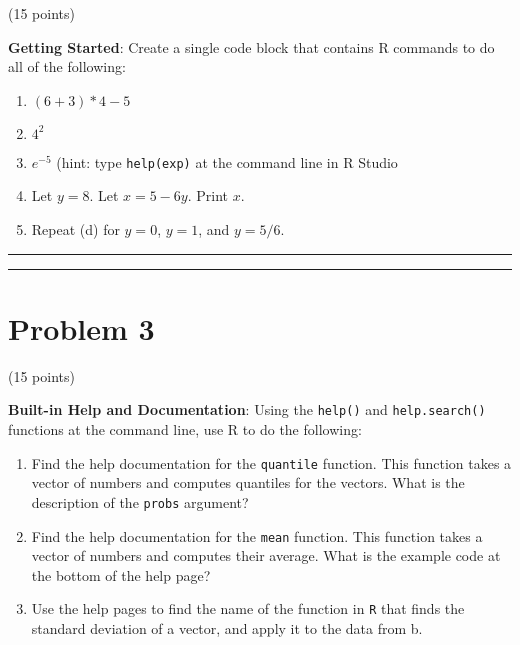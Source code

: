\documentclass[]{article}
\providecommand{\tightlist}{%
  \setlength{\itemsep}{0pt}\setlength{\parskip}{0pt}}
\begin{document}
(15 points)

\textbf{Getting Started}: Create a single code block that contains R
commands to do all of the following:

\begin{enumerate}
\def\labelenumi{\alph{enumi}.}
\tightlist
\item
  \((6+3)*4 - 5\)
\item
  \(4^2\)
\item
  \(e^{-5}\) (hint: type \texttt{help(exp)} at the command line in R
  Studio
\item
  Let \(y = 8\). Let \(x = 5-6y\). Print \(x\).
\item
  Repeat (d) for \(y = 0\), \(y = 1\), and \(y = 5/6\).
\end{enumerate}

\begin{center}\rule{0.5\linewidth}{\linethickness}\end{center}

\begin{center}\rule{0.5\linewidth}{\linethickness}\end{center}

\hypertarget{problem-3}{%
\section{Problem 3}\label{problem-3}}

(15 points)

\textbf{Built-in Help and Documentation}: Using the \texttt{help()} and
\texttt{help.search()} functions at the command line, use R to do the
following:

\begin{enumerate}
\def\labelenumi{\alph{enumi}.}
\tightlist
\item
  Find the help documentation for the \texttt{quantile} function. This
  function takes a vector of numbers and computes quantiles for the
  vectors. What is the description of the \texttt{probs} argument?
\item
  Find the help documentation for the \texttt{mean} function. This
  function takes a vector of numbers and computes their average. What is
  the example code at the bottom of the help page?
\item
  Use the help pages to find the name of the function in \texttt{R} that
  finds the standard deviation of a vector, and apply it to the data
  from b.
\end{enumerate}
\end{document}
